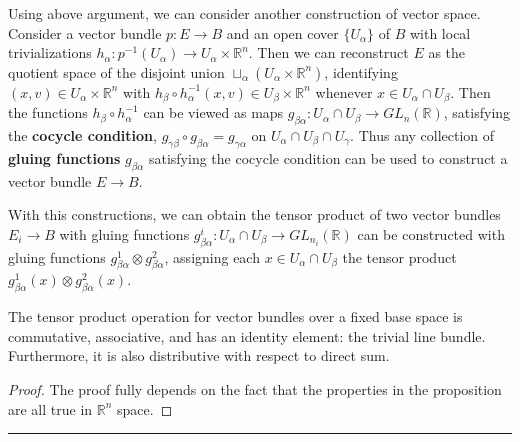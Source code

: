 \begin{exmp} Using above argument, we can consider another construction of vector space. Consider a vector bundle $p:E\rightarrow B$ and an open cover $\{U_\alpha\}$ of $B$ with local trivializations $h_\alpha:p^{-1}(U_\alpha)\rightarrow U_\alpha\times \mathbb{R}^n$. Then we can reconstruct $E$ as the quotient space of the disjoint union $\sqcup_\alpha(U_\alpha\times \mathbb{R}^n)$, identifying $(x,v)\in U_\alpha\times \mathbb{R}^n$ with $h_\beta \circ h_\alpha^{-1}(x,v)\in U_\beta\times \mathbb{R}^n$ whenever $x\in U_\alpha\cap U_\beta$. Then the functions $h_\beta\circ h_\alpha^{-1}$ can be viewed as maps $g_{\beta\alpha}:U_\alpha\cap U_\beta\rightarrow GL_n(\mathbb{R})$, satisfying the \textbf{cocycle condition}, $g_{\gamma\beta}\circ g_{\beta\alpha}=g_{\gamma\alpha}$ on $U_\alpha\cap U_\beta\cap U_\gamma$. Thus any collection of \textbf{gluing functions} $g_{\beta\alpha}$ satisfying the cocycle condition can be used to construct a vector bundle $E\rightarrow B$.

With this constructions, we can obtain the tensor product of two vector bundles $E_i\rightarrow B$ with gluing functions $g_{\beta\alpha}^i:U_\alpha\cap U_\beta\rightarrow GL_{n_i}(\mathbb{R})$ can be constructed with gluing functions $g^1_{\beta\alpha}\otimes g_{\beta\alpha}^2$, assigning each $x\in U_\alpha\cap U_\beta$ the tensor product $g_{\beta\alpha}^1(x)\otimes g_{\beta\alpha}^2(x)$.
\end{exmp}

\begin{prop} The tensor product operation for vector bundles over a fixed base space is commutative, associative, and has an identity element: the trivial line bundle. Furthermore, it is also distributive with respect to direct sum.
\end{prop}
\begin{proof}
The proof fully depends on the fact that the properties in the proposition are all true in $\mathbb{R}^n$ space.
\end{proof}

\noindent\rule{\textwidth}{1pt}
\newline